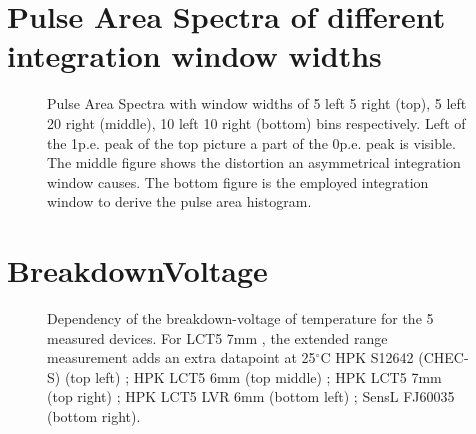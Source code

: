 \documentclass[12pt,article,type=msc,colorback,accentcolor=tud9c]{tudthesis}
\begin{document}
{\clearpage
\section{Pulse Area Spectra of different integration window widths}
\label{subsec:PAS_window}

\begin{figure}[h]
\centering
\label{app:PAS_window}
\end{figure}

\begin{figure}[h]
\ContinuedFloat
\begin{centering}
\caption{Pulse Area Spectra with window widths of 5 left 5 right (top), 5 left 20 right (middle), 10 left 10 right (bottom) bins respectively. Left of the 1p.e. peak of the top picture a part of the 0p.e. peak is visible. The middle figure shows the distortion an asymmetrical integration window causes. The bottom figure is the employed integration window to derive the pulse area histogram.}
\label{app:PAS_window}
\end{centering}
\end{figure}





\newpage
\section{BreakdownVoltage}
\begin{figure}[h]
\begin{centering}
\caption{Dependency of the breakdown-voltage of temperature for the 5 measured devices. For LCT5 7mm , the extended range measurement adds an extra datapoint at 25$^\circ$C HPK S12642 (CHEC-S) (top left) ; HPK LCT5 6mm (top middle) ; HPK LCT5 7mm (top right) ; HPK LCT5 LVR 6mm (bottom left) ; SensL FJ60035 (bottom right).}
\label{app:Device_Vbr}
\end{centering}
\end{figure}

}
\end{document}
